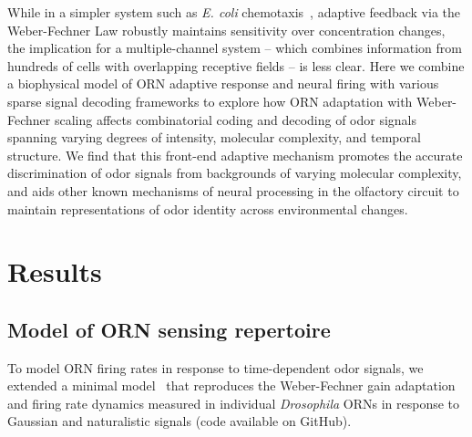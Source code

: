 \documentclass[10pt,prl,aps,showpacs,twocolumn,unsortedaddress,showkeys,linenumbers]{revtex4-1}
\begin{document}
While in a simpler system such as \textit{E. coli} chemotaxis~\cite{EmonetReview}, adaptive feedback via the Weber-Fechner Law robustly maintains sensitivity over concentration changes, the implication for a multiple-channel system -- which combines information from hundreds of cells with overlapping receptive fields  -- is less clear. Here we combine a biophysical model of ORN adaptive response and neural firing with various sparse signal decoding frameworks to explore how ORN adaptation with Weber-Fechner scaling affects combinatorial coding and decoding of odor signals spanning varying degrees of intensity, molecular complexity, and temporal structure. We find that this front-end adaptive mechanism promotes the accurate discrimination of odor signals from backgrounds of varying molecular complexity, and aids other known mechanisms of neural processing in the olfactory circuit to maintain representations of odor identity across environmental changes. %


\section*{Results}






\subsection*{Model of ORN sensing repertoire}

To model ORN firing rates in response to time-dependent odor signals, we extended a minimal model~\cite{srinivas_elife} that reproduces the Weber-Fechner gain adaptation and firing rate dynamics measured in individual \textit{Drosophila} ORNs in response to Gaussian and naturalistic signals (code available on GitHub\cite{code}). 
\end{document}
